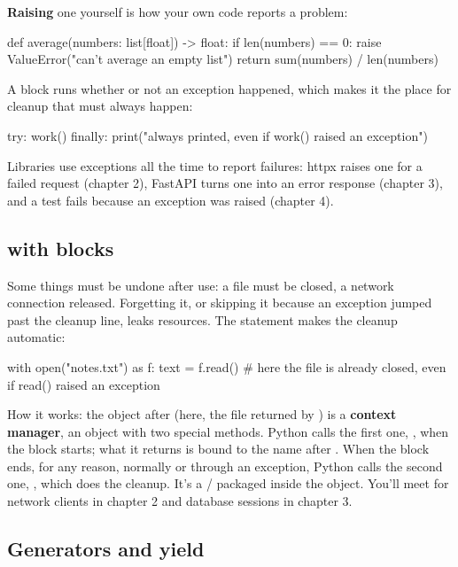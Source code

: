 \textbf{Raising} one yourself is how your own code reports a problem:

\begin{py}
def average(numbers: list[float]) -> float:
	if len(numbers) == 0:
		raise ValueError("can't average an empty list")
	return sum(numbers) / len(numbers)
\end{py}

A  block runs whether or not an exception happened, which makes it the place for cleanup that must always happen:

\begin{py}
try:
	work()
finally:
	print("always printed, even if work() raised an exception")
\end{py}

Libraries use exceptions all the time to report failures: httpx raises one for a failed request (chapter 2), FastAPI turns one into an error response (chapter 3), and a test fails because an exception was raised (chapter 4).

\subsection{with blocks}

Some things must be undone after use: a file must be closed, a network connection released. Forgetting it, or skipping it because an exception jumped past the cleanup line, leaks resources. The  statement makes the cleanup automatic:

\begin{py}
with open("notes.txt") as f:
	text = f.read()
# here the file is already closed, even if read() raised an exception
\end{py}

How it works: the object after  (here, the file returned by ) is a \textbf{context manager}, an object with two special methods. Python calls the first one, , when the block starts; what it returns is bound to the name after . When the block ends, for any reason, normally or through an exception, Python calls the second one, , which does the cleanup. It's a / packaged inside the object. You'll meet  for network clients in chapter 2 and database sessions in chapter 3.

\subsection{Generators and yield}

